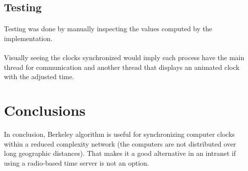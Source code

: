 \documentclass[12pt]{article}
\begin{document}
\subsection{Testing}
\paragraph{}
Testing was done by manually inspecting the values computed by the implementation.

\paragraph{}
Visually seeing the clocks synchronized would imply each process have the main thread for communication and another thread that displays an animated clock with the adjusted time.

\section{Conclusions}
\paragraph{}
In conclusion, Berkeley algorithm is useful for synchronizing computer clocks within a reduced complexity network (the computers are not distributed over long geographic distances). That makes it a good alternative in an intranet if using a radio-based time server is not an option.




\end{document}
